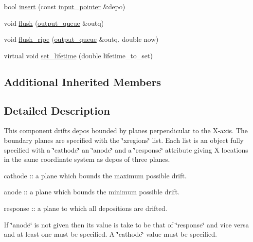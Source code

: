 \begin{DoxyCompactItemize}
\item 
bool \hyperlink{class_wire_cell_1_1_gen_1_1_drifter_a29fcb959e2873e8887595566a12dba7c}{insert} (const \hyperlink{class_wire_cell_1_1_i_queuedout_node_acf5f716a764553f3c7055a9cf67e906e}{input\+\_\+pointer} \&depo)
\item 
void \hyperlink{class_wire_cell_1_1_gen_1_1_drifter_aaff6334fd86eabe10bad0d0efd28dcb2}{flush} (\hyperlink{class_wire_cell_1_1_i_queuedout_node_a39018e4e3dd886befac9636ac791a685}{output\+\_\+queue} \&outq)
\item 
void \hyperlink{class_wire_cell_1_1_gen_1_1_drifter_adae5b8dde52b076da7ad8a9d3e3c2f29}{flush\+\_\+ripe} (\hyperlink{class_wire_cell_1_1_i_queuedout_node_a39018e4e3dd886befac9636ac791a685}{output\+\_\+queue} \&outq, double now)
\item 
virtual void \hyperlink{class_wire_cell_1_1_gen_1_1_drifter_a6ddb93888f24726d2e261a328c1b4164}{set\+\_\+lifetime} (double lifetime\+\_\+to\+\_\+set)
\end{DoxyCompactItemize}
\subsection*{Additional Inherited Members}


\subsection{Detailed Description}
This component drifts depos bounded by planes perpendicular to the X-\/axis. The boundary planes are specified with the \char`\"{}xregions\char`\"{} list. Each list is an object fully specified with a \char`\"{}cathode\char`\"{} an \char`\"{}anode\char`\"{} and a \char`\"{}response\char`\"{} attribute giving X locations in the same coordinate system as depos of three planes.


\begin{DoxyItemize}
\item cathode \+:\+: a plane which bounds the maximum possible drift.
\item anode \+:\+: a plane which bounds the minimum possible drift.
\item response \+:\+: a plane to which all depositions are drifted.
\end{DoxyItemize}

If \char`\"{}anode\char`\"{} is not given then its value is take to be that of \char`\"{}response\char`\"{} and vice versa and at least one must be specified. A \char`\"{}cathode\char`\"{} value must be specified.

